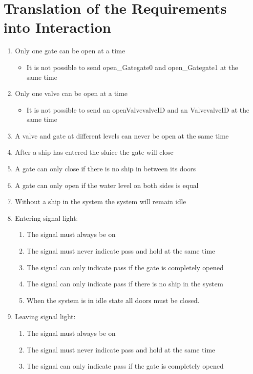 \section{Translation of the Requirements into Interaction}
\begin{enumerate}
	\item Only one gate can be open at a time
	
		\begin{itemize}
			\item It is not possible to send open\_Gategate0 and open\_Gategate1 at the same time
		\end{itemize}
	
	\item Only one valve can be open at a time
	
		\begin{itemize}
			\item It is not possible to send an openValvevalveID and an ValvevalveID at the same time
		\end{itemize}
	
	\item A valve and gate at different levels can never be open at the same time
	\item After a ship has entered the sluice the gate will close
	\item A gate can only close if there is no ship in between its doors
	\item A gate can only open if the water level on both sides is equal
	\item Without a ship in the system the system will remain idle
	
	\item Entering signal light:
		\begin{enumerate}
			\item The signal must always be on
			\item The signal must never indicate pass and hold at the same time
			\item The signal can only indicate pass if the gate is completely opened
			\item The signal can only indicate pass if there is no ship in the system
			\item When the system is in idle state all doors must be closed.
			
		\end{enumerate}
	\item Leaving signal light:
		\begin{enumerate}
			\item The signal must always be on
			\item The signal must never indicate pass and hold at the same time
			\item The signal can only indicate pass if the gate is completely opened
		\end{enumerate}
\end{enumerate}